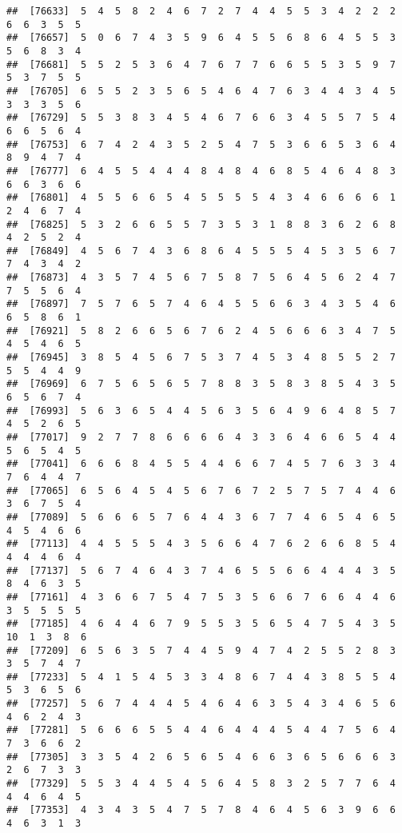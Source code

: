 \documentclass[
]{book}
\begin{document}
\begin{verbatim}
##  [76633]  5  4  5  8  2  4  6  7  2  7  4  4  5  5  3  4  2  2  2  6  6  3  5  5
##  [76657]  5  0  6  7  4  3  5  9  6  4  5  5  6  8  6  4  5  5  3  5  6  8  3  4
##  [76681]  5  5  2  5  3  6  4  7  6  7  7  6  6  5  5  3  5  9  7  5  3  7  5  5
##  [76705]  6  5  5  2  3  5  6  5  4  6  4  7  6  3  4  4  3  4  5  3  3  3  5  6
##  [76729]  5  5  3  8  3  4  5  4  6  7  6  6  3  4  5  5  7  5  4  6  6  5  6  4
##  [76753]  6  7  4  2  4  3  5  2  5  4  7  5  3  6  6  5  3  6  4  8  9  4  7  4
##  [76777]  6  4  5  5  4  4  4  8  4  8  4  6  8  5  4  6  4  8  3  6  6  3  6  6
##  [76801]  4  5  5  6  6  5  4  5  5  5  5  4  3  4  6  6  6  6  1  2  4  6  7  4
##  [76825]  5  3  2  6  6  5  5  7  3  5  3  1  8  8  3  6  2  6  8  4  2  5  2  4
##  [76849]  4  5  6  7  4  3  6  8  6  4  5  5  5  4  5  3  5  6  7  7  4  3  4  2
##  [76873]  4  3  5  7  4  5  6  7  5  8  7  5  6  4  5  6  2  4  7  7  5  5  6  4
##  [76897]  7  5  7  6  5  7  4  6  4  5  5  6  6  3  4  3  5  4  6  6  5  8  6  1
##  [76921]  5  8  2  6  6  5  6  7  6  2  4  5  6  6  6  3  4  7  5  4  5  4  6  5
##  [76945]  3  8  5  4  5  6  7  5  3  7  4  5  3  4  8  5  5  2  7  5  5  4  4  9
##  [76969]  6  7  5  6  5  6  5  7  8  8  3  5  8  3  8  5  4  3  5  6  5  6  7  4
##  [76993]  5  6  3  6  5  4  4  5  6  3  5  6  4  9  6  4  8  5  7  4  5  2  6  5
##  [77017]  9  2  7  7  8  6  6  6  6  4  3  3  6  4  6  6  5  4  4  5  6  5  4  5
##  [77041]  6  6  6  8  4  5  5  4  4  6  6  7  4  5  7  6  3  3  4  7  6  4  4  7
##  [77065]  6  5  6  4  5  4  5  6  7  6  7  2  5  7  5  7  4  4  6  3  6  7  5  4
##  [77089]  5  6  6  6  5  7  6  4  4  3  6  7  7  4  6  5  4  6  5  4  5  4  6  6
##  [77113]  4  4  5  5  5  4  3  5  6  6  4  7  6  2  6  6  8  5  4  4  4  4  6  4
##  [77137]  5  6  7  4  6  4  3  7  4  6  5  5  6  6  4  4  4  3  5  8  4  6  3  5
##  [77161]  4  3  6  6  7  5  4  7  5  3  5  6  6  7  6  6  4  4  6  3  5  5  5  5
##  [77185]  4  6  4  4  6  7  9  5  5  3  5  6  5  4  7  5  4  3  5 10  1  3  8  6
##  [77209]  6  5  6  3  5  7  4  4  5  9  4  7  4  2  5  5  2  8  3  3  5  7  4  7
##  [77233]  5  4  1  5  4  5  3  3  4  8  6  7  4  4  3  8  5  5  4  5  3  6  5  6
##  [77257]  5  6  7  4  4  4  5  4  6  4  6  3  5  4  3  4  6  5  6  4  6  2  4  3
##  [77281]  5  6  6  6  5  5  4  4  6  4  4  4  5  4  4  7  5  6  4  7  3  6  6  2
##  [77305]  3  3  5  4  2  6  5  6  5  4  6  6  3  6  5  6  6  6  3  2  6  7  3  3
##  [77329]  5  5  3  4  4  5  4  5  6  4  5  8  3  2  5  7  7  6  4  4  4  6  4  5
##  [77353]  4  3  4  3  5  4  7  5  7  8  4  6  4  5  6  3  9  6  6  4  6  3  1  3

\end{verbatim}
\end{document}
